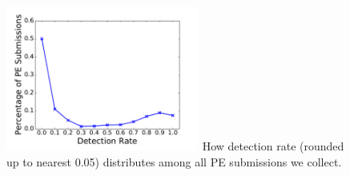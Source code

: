 \begin{figure}[t!]
\begin{center}
\includegraphics[width=2.5in]{figure/DetectionRate}
{
How detection rate (rounded up to nearest 0.05) distributes among all PE submissions we collect. 
}
\end{center}
\end{figure}